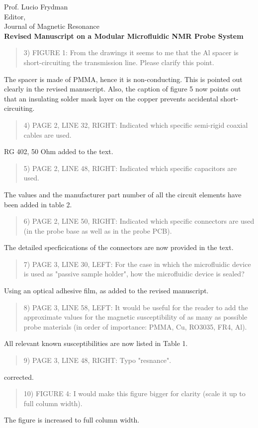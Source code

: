 \documentclass{mu-soton-letter}
\newenvironment{reviewer} {\begin{quote}\color{black!50}} {\end{quote}}
\begin{document}
\begin{letter}{Prof. Lucio Frydman\\
  Editor,\\
  Journal of Magnetic Resonance\\[2cm]
  \textbf{Revised Manuscript on a Modular Microfluidic NMR Probe System}}
\begin{reviewer}
3) FIGURE 1: From the drawings it seems to me that the Al spacer is short-circuiting the transmission line. Please clarify this point.
\end{reviewer}
The spacer is made of PMMA, hence it is non-conducting. This is pointed out
clearly in the revised manuscript. Also, the caption of figure 5 now points out
that an insulating solder mask layer on the copper prevents accidental short-circuiting.
\begin{reviewer}
4) PAGE 2, LINE 32, RIGHT: Indicated which specific semi-rigid coaxial cables are used.
\end{reviewer}
RG 402, 50 Ohm added to the text.
\begin{reviewer}
5) PAGE 2, LINE 48, RIGHT: Indicated which specific capacitors are used.
\end{reviewer}
The values and the manufacturer part number of all the circuit elements
have been added in table 2.

\begin{reviewer}
6) PAGE 2, LINE 50, RIGHT: Indicated which specific connectors are used (in the probe base as well as in the probe PCB).
\end{reviewer}
The detailed specficications of the connectors are now provided in the text.

\begin{reviewer}
7) PAGE 3, LINE 30, LEFT: For the case in which the microfluidic device is used as "passive sample holder", how the microfluidic device is sealed?
\end{reviewer}
Using an optical adhesive film, as added to the revised manuscript.

\begin{reviewer}
8) PAGE 3, LINE 58, LEFT: It would be useful for the reader to add the approximate values for the magnetic susceptibility of as many as possible probe materials (in order of importance: PMMA, Cu, RO3035, FR4, Al).
\end{reviewer}
All relevant known susceptibilities are now listed in Table 1.

\begin{reviewer}
9) PAGE 3, LINE 48, RIGHT: Typo "resnance".
\end{reviewer}
corrected.

\begin{reviewer}
10) FIGURE 4: I would make this figure bigger for clarity (scale it up to full column width).
\end{reviewer}
The figure is increased to full column width.


\end{letter}
\end{document}
